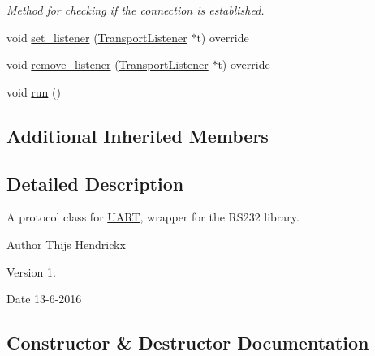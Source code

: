 \begin{DoxyCompactItemize}
\begin{DoxyCompactList}\small\item\em Method for checking if the connection is established. \end{DoxyCompactList}\item 
void \hyperlink{class_u_a_r_t_a865baf02a528c89bd5c0c2f01e04c2f1}{set\+\_\+listener} (\hyperlink{class_transport_listener}{Transport\+Listener} $\ast$t) override
\item 
void \hyperlink{class_u_a_r_t_ab70270f949057521043566efbdb7b3c3}{remove\+\_\+listener} (\hyperlink{class_transport_listener}{Transport\+Listener} $\ast$t) override
\item 
void \hyperlink{class_u_a_r_t_a9efd5e5c4d36ad9f69b9e22feb11ca0e}{run} ()
\end{DoxyCompactItemize}
\subsection*{Additional Inherited Members}


\subsection{Detailed Description}
A protocol class for \hyperlink{class_u_a_r_t}{U\+A\+R\+T}, wrapper for the R\+S232 library. \begin{DoxyAuthor}{Author}
Thijs Hendrickx 
\end{DoxyAuthor}
\begin{DoxyVersion}{Version}
1. 
\end{DoxyVersion}
\begin{DoxyDate}{Date}
13-\/6-\/2016 
\end{DoxyDate}


\subsection{Constructor \& Destructor Documentation}
\hypertarget{class_u_a_r_t_a2912097d50627bf539e3247845ceb899}{}
